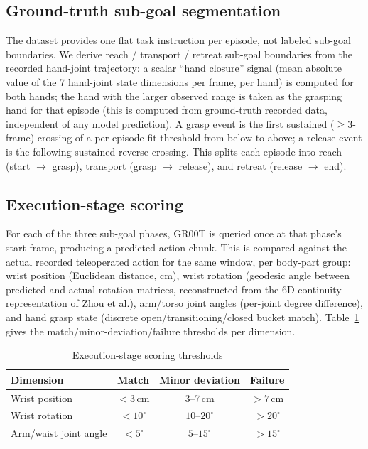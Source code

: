 \documentclass[conference]{IEEEtran}
\begin{document}
\subsection{Ground-truth sub-goal segmentation}

The dataset provides one flat task instruction per episode, not labeled sub-goal
boundaries. We derive reach / transport / retreat sub-goal boundaries from the recorded
hand-joint trajectory: a scalar ``hand closure'' signal (mean absolute value of the 7
hand-joint state dimensions per frame, per hand) is computed for both hands; the hand
with the larger observed range is taken as the grasping hand for that episode (this is
computed from ground-truth recorded data, independent of any model prediction). A grasp
event is the first sustained ($\geq 3$-frame) crossing of a per-episode-fit threshold
from below to above; a release event is the following sustained reverse crossing. This
splits each episode into reach (start $\rightarrow$ grasp), transport (grasp
$\rightarrow$ release), and retreat (release $\rightarrow$ end).

\subsection{Execution-stage scoring}

For each of the three sub-goal phases, GR00T is queried once at that phase's start frame,
producing a predicted action chunk. This is compared against the actual recorded
teleoperated action for the same window, per body-part group: wrist position (Euclidean
distance, cm), wrist rotation (geodesic angle between predicted and actual rotation
matrices, reconstructed from the 6D continuity representation of Zhou et al.), arm/torso
joint angles (per-joint degree difference), and hand grasp state (discrete
open/transitioning/closed bucket match). Table~\ref{tab:thresholds} gives the
match/minor-deviation/failure thresholds per dimension.

\begin{table}[htbp]
\centering
\caption{Execution-stage scoring thresholds}
\label{tab:thresholds}
\begin{tabular}{@{}lccc@{}}
\toprule
Dimension & Match & Minor deviation & Failure \\
\midrule
Wrist position & $<3$\,cm & 3--7\,cm & $>7$\,cm \\
Wrist rotation & $<10^\circ$ & $10$--$20^\circ$ & $>20^\circ$ \\
Arm/waist joint angle & $<5^\circ$ & $5$--$15^\circ$ & $>15^\circ$ \\
\bottomrule
\end{tabular}
\end{table}
\end{document}
